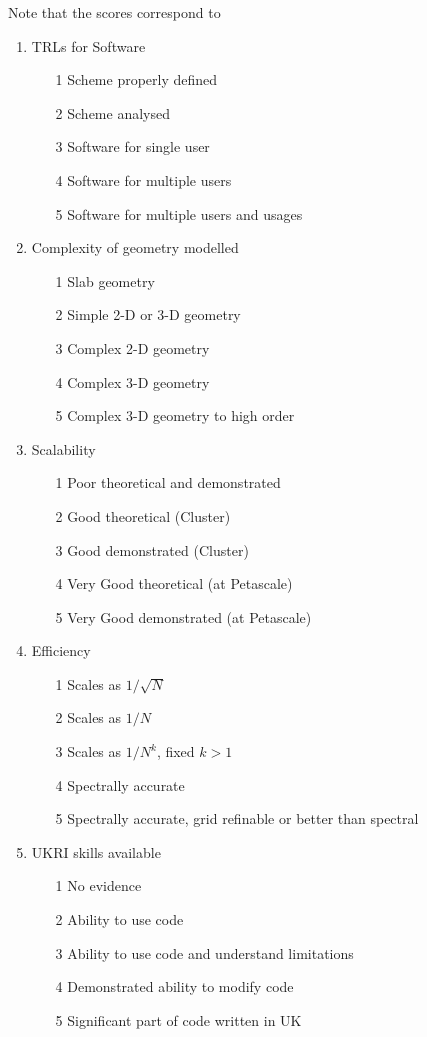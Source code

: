 Note that the scores correspond to
\begin{enumerate}
\item TRLs for Software
\begin{itemize}
\item[1] Scheme properly defined
\item[2] Scheme analysed
\item[3] Software for single user
\item[4] Software for multiple users
\item[5] Software for multiple users and usages
\end{itemize}
\item Complexity of geometry modelled
\begin{itemize}
\item[1] Slab geometry
\item[2] Simple 2-D or 3-D geometry
\item[3] Complex 2-D geometry
\item[4] Complex 3-D geometry
\item[5] Complex 3-D geometry to high order
\end{itemize}
\item Scalability
\begin{itemize}
\item[1] Poor theoretical and demonstrated
\item[2] Good theoretical (Cluster)
\item[3] Good demonstrated (Cluster)
\item[4] Very Good theoretical (at Petascale)
\item[5] Very Good demonstrated (at Petascale)
\end{itemize}
\item Efficiency
\begin{itemize}
\item[1] Scales as $1/\sqrt{N}$
\item[2] Scales as $1/N$
\item[3] Scales as $1/N^{k}$, fixed $k>1$
\item[4] Spectrally accurate
\item[5] Spectrally accurate, grid refinable or better than spectral
\end{itemize}
\item UKRI skills available
\begin{itemize}
\item[1] No evidence
\item[2] Ability to use code
\item[3] Ability to use code and understand limitations
\item[4] Demonstrated ability to modify code
\item[5] Significant part of code written in UK
\end{itemize}
\end{enumerate}


